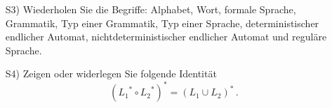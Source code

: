 
\begin{exercise}

\begin{enumerate}
\item[S3)] Wiederholen Sie die Begriffe:
  Alphabet, Wort, formale Sprache, Grammatik, Typ einer Grammatik, Typ einer Sprache,
  deterministischer endlicher Automat, nichtdeterministischer endlicher Automat und reguläre Sprache.
\item[S4)] Zeigen oder widerlegen Sie folgende Identität
\[
  ({L_1}^{*}\circ {L_2}^{*})^{*}=(L_1\cup L_2)^{*}\,.
\]
\end{enumerate}

\end{exercise}
